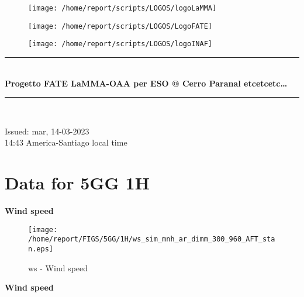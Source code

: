 \documentclass[11pt,english]{article}
\newcommand{\HRule}{\rule{\linewidth}{0.5mm}}
\begin{document}
\begin{figure}
\begin{center}
\hspace{.5cm}
\parbox{5.5cm}{\texttt{[image: /home/report/scripts/LOGOS/logoLaMMA]}}
\hspace{.5cm}
\parbox{5.5cm}{\texttt{[image: /home/report/scripts/LOGOS/LogoFATE]}}
\hspace{.5cm}
\parbox{5.5cm}{\texttt{[image: /home/report/scripts/LOGOS/logoINAF]}}
\hspace{.1cm}
\vspace{1.2cm}
\end{center}
\end{figure}

\begin{center}
\HRule \\[0.4cm]
\Huge{\textbf{Progetto FATE LaMMA-OAA per ESO @ Cerro Paranal etcetcetc\ldots}}
\HRule \\[0.4cm]
\end{center}

\begin{center}
\vspace{2cm}\Huge{Issued: mar, 14-03-2023\\ 14:43 America-Santiago local time}
\end{center}


\clearpage
\section{Data for 5GG 1H}
\newpage

\begin{center}
\textbf{Wind speed}
\end{center}

\begin{figure}[htbp]
\centering
{\texttt{[image: /home/report/FIGS/5GG/1H/ws\_sim\_mnh\_ar\_dimm\_300\_960\_AFT\_stan.eps]}}
\caption{ws - Wind speed}\label{fig:ws1}
\end{figure}
\newpage

\begin{center}
\textbf{Wind speed}
\end{center}
\end{document}
